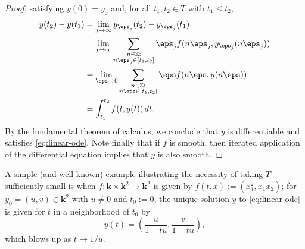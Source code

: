 \documentclass[reqno]{amsart} 
\begin{document}
\begin{proof}
  satisfying $y(0) = y_0$ and, for all $t_1,t_2 \in T$ with $t_1 \leq t_2$,
  \begin{align*}
    y(t_2) - y(t_1)
    &=
  \lim_{j \rightarrow \infty}
      y_{\eps_j}(t_2) - y_{\eps_j}(t_1)
      \\
    &=
  \lim_{j \rightarrow \infty}
  \sum _{
    \substack{
      n \in \mathbb{Z} : \\
      n \eps_j \in [t_1,t_2]
    }
  }
    \eps_j f(n \eps_j, y_{\eps_j}(n \eps_j))
    \\
    &=
  \lim_{\eps \rightarrow 0}
  \sum _{
    \substack{
      n \in \mathbb{Z} : \\
      n \eps \in [t_1,t_2]
    }
  }
    \eps f(n \eps, y(n \eps))
    \\
    &=
  \int_{t_1}^{t_2} f(t,y(t)) \, d t.
  \end{align*}
  By the fundamental theorem of calculus, we
  conclude that $y$ is differentiable and satisfies \eqref{eq:linear-ode}.
 Note finally that if $f$ is smooth, then iterated application
  of the differential equation implies that $y$ is also smooth.
\end{proof}
\begin{example}
  A simple (and well-known) example
  illustrating the necessity of taking $T$ sufficiently small
  is when
  $f : \mathbf{k} \times \mathbf{k}^2 \rightarrow \mathbf{k}^2$
  is given by
  $f(t,x) := (x_1^2,x_1 x_2)$;
  for $y_0 = (u,v) \in \mathbf{k}^2$
  with $u \neq 0$
  and $t_0 := 0$,
  the unique solution $y$ to \eqref{eq:linear-ode}
  is given for $t$ in a neighborhood of $t_0$ by
  \begin{equation*}
    y(t)
    = (\frac{u}{1 - t u}, \frac{v}{1 - t u}),
  \end{equation*}
  which blows up as $t \rightarrow 1/u$.
\end{example}
\end{document}
